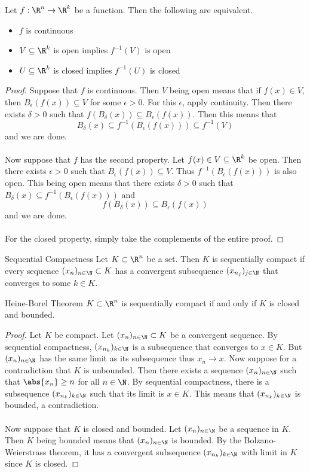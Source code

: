 \documentclass[a4paper]{article}
\begin{document}
\begin{thm}{}{} Let $f:\R^n\to\R^k$ be a function. Then the following are equivalent. 
\begin{itemize}
\item $f$ is continuous
\item $V\subseteq\R^k$ is open implies $f^{-1}(V)$ is open
\item $U\subseteq\R^k$ is closed implies $f^{-1}(U)$ is closed
\end{itemize}
\tcbline
\begin{proof}
Suppose that $f$ is continuous. Then $V$ being open means that if $f(x)\in V$, then $B_\epsilon(f(x))\subseteq V$ for some $\epsilon>0$. For this $\epsilon$, apply continuity. Then there exists $\delta>0$ such that $f(B_\delta(x))\subseteq B_\epsilon(f(x))$. Then this means that $$B_\delta(x)\subseteq f^{-1}(B_\epsilon(f(x)))\subseteq f^{-1}(V)$$ and we are done. \\~\\
Now suppose that $f$ has the second property. Let $f(x)\in V\subseteq\R^k$ be open. Then there exists $\epsilon>0$ such that $B_\epsilon(f(x))\subseteq V$. Thus $f^{-1}(B_\epsilon(f(x)))$ is also open. This being open means that there exists $\delta>0$ such that $B_\delta(x)\subseteq f^{-1}(B_\epsilon(f(x)))$ and $$f(B_\delta(x))\subseteq B_\epsilon(f(x))$$ and we are done. \\~\\
For the closed property, simply take the complements of the entire proof. 
\end{proof}
\end{thm}

\begin{defn}{Sequential Compactness}{} Let $K\subset\R^n$ be a set. Then $K$ is sequentially compact if every sequence $(x_n)_{n\in\N}\subset K$ has a convergent subsequence $(x_{n_j})_{j\in\N}$ that converges to some $k\in K$. 
\end{defn}

\begin{prp}{Heine-Borel Theorem}{} $K\subset\R^n$ is sequentially compact if and only if $K$ is closed and bounded. \tcbline
\begin{proof}
Let $K$ be compact. Let $(x_n)_{n\in\N}\subset K$ be a convergent sequence. By sequential compactness, $(x_{n_k})_{k\in\N}$ is a subsequence that converges to $x\in K$. But $(x_n)_{n\in\N}$ has the same limit as its subsequence thus $x_n\to x$. Now suppose for a contradiction that $K$ is unbounded. Then there exists a sequence $(x_n)_{n\in\N}$ such that $\abs{x_n}\geq n$ for all $n\in\N$. By sequential compactness, there is a subsequence $(x_{n_k})_{k\in\N}$ such that its limit is $x\in K$. This means that $(x_{n_k})_{k\in\N}$ is bounded, a contradiction. \\~\\
Now suppose that $K$ is closed and bounded. Let $(x_n)_{n\in\N}$ be a sequence in $K$. Then $K$ being bounded means that $(x_n)_{n\in\N}$ is bounded. By the Bolzano-Weierstrass theorem, it has a convergent subsequence $(x_{n_k})_{k\in\N}$ with limit in $K$ since $K$ is closed. 
\end{proof}
\end{prp}
\end{document}
